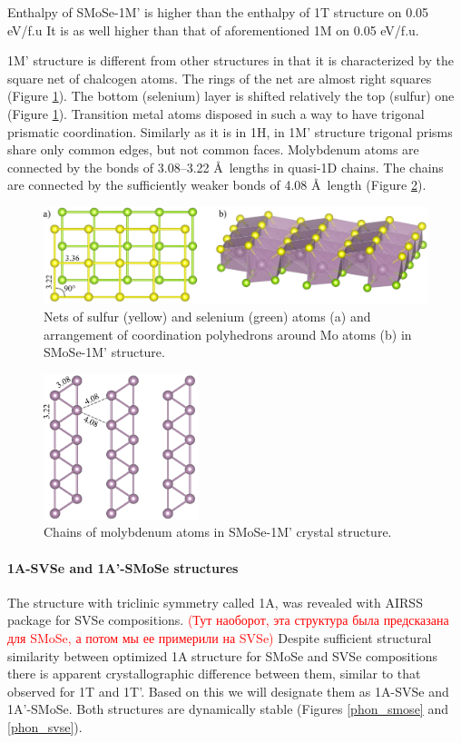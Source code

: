 \documentclass[a4paperm]{article}
\begin{document}
Enthalpy of SMoSe-1M' is higher than the enthalpy of 1T structure on 0.05 eV/f.u
It is as well higher than that of aforementioned 1M on 0.05 eV/f.u.

1M' structure is different from other structures in that it is characterized by the square net of chalcogen atoms.
The rings of the net are almost right squares (Figure \ref{H-hor}).
The bottom (selenium) layer is shifted relatively the top (sulfur) one (Figure \ref{H-hor}).
Transition metal atoms disposed in such a way to have trigonal prismatic coordination.
Similarly as it is in 1H, in 1M' structure trigonal prisms share only common edges, but not common faces.
Molybdenum atoms are connected by the bonds of 3.08--3.22 \AA\ lengths in quasi-1D chains.
The chains are connected by the sufficiently weaker bonds of 4.08 \AA\ length (Figure \ref{H-hor_Mo}).


\begin{figure}[H]
	\includegraphics[width=\textwidth]{H-hor.png}
	\caption{Nets of sulfur (yellow) and selenium (green) atoms (a) and arrangement of coordination polyhedrons around Mo atoms (b) in SMoSe-1M' structure.}
	\label{H-hor}
\end{figure} 


\begin{figure}[H]
	\includegraphics[width=0.4\textwidth]{H-hor_Mo.png}
	\caption{Chains of molybdenum atoms in SMoSe-1M' crystal structure.}
	\label{H-hor_Mo}
\end{figure} 


\paragraph{1A-SVSe and 1A'-SMoSe structures}
The structure with triclinic symmetry called 1A, was revealed with AIRSS package for SVSe compositions.
\textcolor{red}{(Тут наоборот, эта структура была предсказана для SMoSe, а потом мы ее примерили на SVSe)}
Despite sufficient structural similarity between optimized 1A structure for SMoSe and SVSe compositions there is apparent crystallographic difference between them, similar to that observed for 1T and 1T'.
Based on this we will designate them as 1A-SVSe and 1A'-SMoSe.
Both structures are dynamically stable (Figures \ref{phon_smose} and \ref{phon_svse}).
\end{document}
